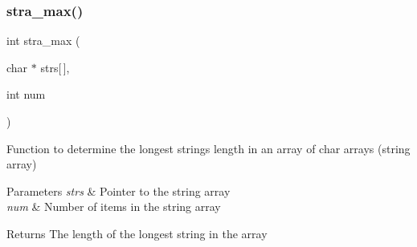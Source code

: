 \subsubsection{\texorpdfstring{stra\+\_\+max()}{stra\_max()}}
{\footnotesize\ttfamily int stra\+\_\+max (\begin{DoxyParamCaption}\item[{char $\ast$}]{strs\mbox{[}$\,$\mbox{]},  }\item[{int}]{num }\end{DoxyParamCaption})}

Function to determine the longest string\textquotesingle{}s length in an array of char arrays (string array) 
\begin{DoxyParams}{Parameters}
{\em strs} & Pointer to the string array \\
\hline
{\em num} & Number of items in the string array \\
\hline
\end{DoxyParams}
\begin{DoxyReturn}{Returns}
The length of the longest string in the array 
\end{DoxyReturn}
